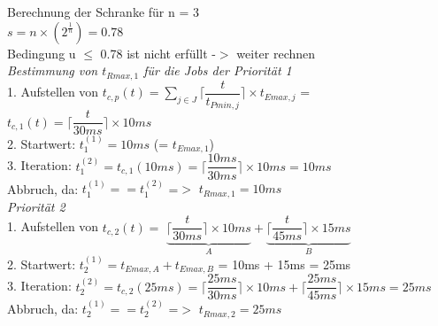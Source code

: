 \documentclass[12pt,a4paper,oneside,ngerman]{article}
\begin{document}
Berechnung der Schranke für n = 3 \\
\(s = n\times( 2^\frac{1}{n}) = 0.78\)\\

Bedingung u $\leq$ 0.78 ist nicht erfüllt -$>$ weiter rechnen\\

\emph{Bestimmung von \(t_{Rmax,1}\) für die Jobs der Priorität 1}\\
1. Aufstellen von \( t_{c,p}(t) = \displaystyle\sum_{j \in J} \Big\lceil \dfrac{t}{ t_{Pmin,j} } \Big\rceil \times t_{Emax,j} \) = \( t_{c,1}(t) = \Big\lceil \dfrac{t}{ 30ms } \Big\rceil \times 10ms \)\\
2. Startwert: \( t_{1}^{(1)} = 10ms \) (= \(t_{Emax,1}\)) \\
3. Iteration: \( t_{1}^{(2)} = t_{c,1}(10ms) = \Big\lceil \dfrac{10ms}{30ms} \Big\rceil \times 10ms = 10ms\)\\
Abbruch, da: \( t_{1}^{(1)} == t_{1}^{(2)} \) =$>$ \( t_{Rmax,1} = 10ms \)\\


\emph{Priorität 2}\\
1. Aufstellen von \( t_{c,2}(t) =\) \(\underbrace{\Big\lceil \dfrac{t}{ 30ms } \Big\rceil \times 10ms }_{A} + \underbrace{\Big\lceil \dfrac{t}{ 45ms } \Big\rceil \times 15ms}_{B}\) \\
2. Startwert: \( t_{2}^{(1)} = t_{Emax,A} + t_{Emax,B} \) = 10ms + 15ms = 25ms \\
3. Iteration: \( t_{2}^{(2)} = t_{c,2}(25ms) = \Big\lceil \dfrac{25ms}{30ms} \Big\rceil \times 10ms + \Big\lceil \dfrac{25ms}{45ms} \Big\rceil \times 15ms = 25ms\)\\
Abbruch, da: \( t_{2}^{(1)} == t_{2}^{(2)} \) =$>$ \( t_{Rmax,2} = 25ms \)\\
\end{document}
